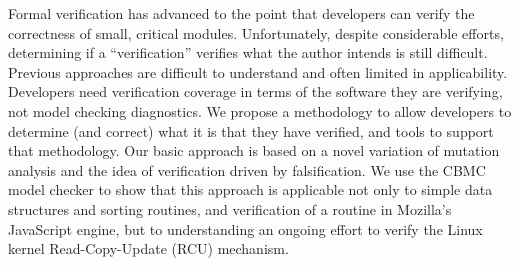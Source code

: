 Formal verification has advanced to the point that developers can verify the correctness of small, critical modules.  Unfortunately, despite considerable efforts, determining if a ``verification'' verifies what the author intends is still difficult.  Previous approaches are difficult to understand and often limited in applicability.  Developers need verification coverage in terms of the software they are verifying, not model checking diagnostics.  We propose a methodology to allow developers to determine (and correct) what it is that they have verified, and tools to support that methodology.  Our basic approach is based on a novel variation of mutation analysis and the idea of verification driven by falsification.  We use the CBMC model checker to show that this approach is applicable not only to simple data structures and sorting routines, and verification of a routine in Mozilla's JavaScript engine, but to understanding an ongoing effort to verify the Linux kernel Read-Copy-Update (RCU) mechanism.
